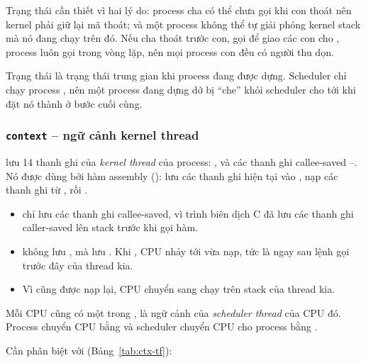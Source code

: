 Trạng thái  cần thiết vì hai lý do: process cha
có thể chưa gọi  khi con thoát nên kernel phải giữ lại mã thoát;
và một process không thể tự giải phóng kernel stack mà nó đang chạy trên đó.
Nếu cha thoát trước con,  gọi  để giao các con
cho , process luôn gọi  trong vòng lặp, nên mọi process
con đều có người thu dọn.

Trạng thái  là trạng thái trung gian khi process đang được dựng.
Scheduler chỉ chạy process , nên một process đang dựng dở bị
``che'' khỏi scheduler cho tới khi  đặt nó thành 
ở bước cuối cùng.

\subsubsection{\texttt{context} -- ngữ cảnh kernel thread}

 lưu 14 thanh ghi của \emph{kernel thread} của process:
,  và các thanh ghi callee-saved --. Nó
được dùng bởi hàm assembly  ():
lưu các thanh ghi hiện tại vào , nạp các thanh ghi từ ,
rồi .

\begin{itemize}
  \item {} chỉ lưu các thanh ghi callee-saved, vì trình biên dịch C đã
        lưu các thanh ghi caller-saved lên stack trước khi gọi hàm.
  \item {} không lưu , mà lưu . Khi , CPU nhảy tới  vừa
        nạp, tức là ngay sau lệnh gọi  trước đây của thread kia.
  \item Vì  cũng được nạp lại, CPU chuyển sang chạy trên stack của
        thread kia.
\end{itemize}

Mỗi CPU cũng có một  trong , là ngữ cảnh của
\emph{scheduler thread} của CPU đó. Process chuyển CPU bằng
 và scheduler chuyển CPU cho
process bằng .

Cần phân biệt  với  (Bảng~\ref{tab:ctx-tf}):

